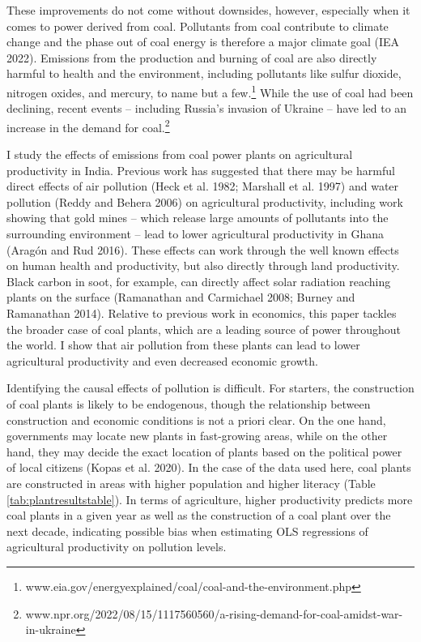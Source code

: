 \documentclass[
]{article}
\begin{document}
These improvements do not come without downsides, however, especially when it comes to power derived from coal. Pollutants from coal contribute to climate change and the phase out of coal energy is therefore a major climate goal (IEA 2022). Emissions from the production and burning of coal are also directly harmful to health and the environment, including pollutants like sulfur dioxide, nitrogen oxides, and mercury, to name but a few.\footnote{www.eia.gov/energyexplained/coal/coal-and-the-environment.php} While the use of coal had been declining, recent events -- including Russia's invasion of Ukraine -- have led to an increase in the demand for coal.\footnote{www.npr.org/2022/08/15/1117560560/a-rising-demand-for-coal-amidst-war-in-ukraine}

I study the effects of emissions from coal power plants on agricultural productivity in India. Previous work has suggested that there may be harmful direct effects of air pollution (Heck et al. 1982; Marshall et al. 1997) and water pollution (Reddy and Behera 2006) on agricultural productivity, including work showing that gold mines -- which release large amounts of pollutants into the surrounding environment -- lead to lower agricultural productivity in Ghana (Aragón and Rud 2016). These effects can work through the well known effects on human health and productivity, but also directly through land productivity. Black carbon in soot, for example, can directly affect solar radiation reaching plants on the surface (Ramanathan and Carmichael 2008; Burney and Ramanathan 2014). Relative to previous work in economics, this paper tackles the broader case of coal plants, which are a leading source of power throughout the world. I show that air pollution from these plants can lead to lower agricultural productivity and even decreased economic growth.

Identifying the causal effects of pollution is difficult. For starters, the construction of coal plants is likely to be endogenous, though the relationship between construction and economic conditions is not a priori clear. On the one hand, governments may locate new plants in fast-growing areas, while on the other hand, they may decide the exact location of plants based on the political power of local citizens (Kopas et al. 2020). In the case of the data used here, coal plants are constructed in areas with higher population and higher literacy (Table \ref{tab:plantresultstable}). In terms of agriculture, higher productivity predicts more coal plants in a given year as well as the construction of a coal plant over the next decade, indicating possible bias when estimating OLS regressions of agricultural productivity on pollution levels.
\end{document}
